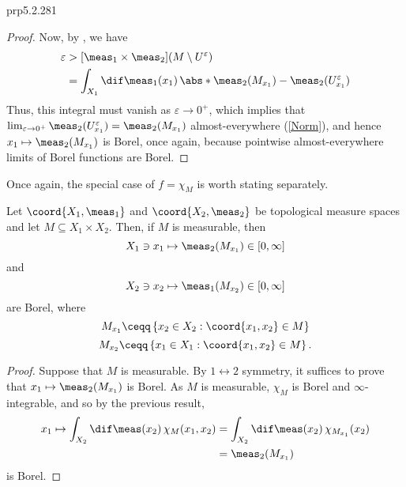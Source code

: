 \begin{prp}{}{prp5.2.281}
\begin{proof}
Now, by , we have
\begin{equation}
\begin{split}
\varepsilon & >[\meas _1\times \meas _2](M\setminus U^{\varepsilon}) \\
& =\int _{X_1}\dif \meas _1(x_1)\, \abs*{\meas _2(M_{x_1})-\meas _2(U_{x_1}^{\varepsilon})}
\end{split}
\end{equation}
Thus, this integral must vanish as $\varepsilon \to 0^+$, which implies that $\lim _{\varepsilon \to 0^+}\meas _2(U_{x_1}^{\varepsilon})=\meas _2(M_{x_1})$ almost-everywhere (\cref{Norm}), and hence $x_1\mapsto \meas _2(M_{x_1})$ is Borel, once again, because pointwise almost-everywhere limits of Borel functions are Borel.
\end{proof}
\end{prp}
Once again, the special case of $f=\chi _M$ is worth stating separately.
\begin{crl}{}{}
Let $\coord{X_1,\meas _1}$ and $\coord{X_2,\meas _2}$ be topological measure spaces and let $M\subseteq X_1\times X_2$.  Then, if $M$ is measurable, then
\begin{equation}
X_1\ni x_1\mapsto \meas _2(M_{x_1})\in [0,\infty ]
\end{equation}
and
\begin{equation}
X_2\ni x_2\mapsto \meas _1(M_{x_2})\in [0,\infty ]
\end{equation}
are Borel, where
\begin{equation}
M_{x_1}\ceqq \left\{ x_2\in X_2:\coord{x_1,x_2}\in M\right\}
\end{equation}
\begin{equation}
M_{x_2}\ceqq \left\{ x_1\in X_1:\coord{x_1,x_2}\in M\right\} .
\end{equation}
\begin{proof}
Suppose that $M$ is measurable.  By $1\leftrightarrow 2$ symmetry, it suffices to prove that $x_1\mapsto \meas _2(M_{x_1})$ is Borel.  As $M$ is measurable, $\chi _M$ is Borel and $\infty$-integrable, and so by the previous result,
\begin{equation*}
\begin{split}
x_1\mapsto \int _{X_2}\dif \meas (x_2)\, \chi _M(x_1,x_2) & =\int _{X_2}\dif \meas (x_2)\, \chi _{M_{x_1}}(x_2) \\
& =\meas _2(M_{x_1})
\end{split}
\end{equation*}
is Borel.
\end{proof}
\end{crl}

